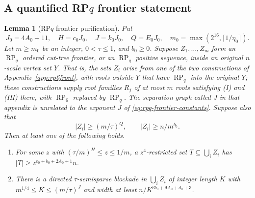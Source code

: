\documentclass[11pt,a4paper]{article}
\newtheorem{lemma}[theorem]{Lemma}
\theoremstyle{definition}
\theoremstyle{remark}
\numberwithin{equation}{section}
\DeclareMathOperator{\RP}{RP}
\begin{document}
\subsection{A quantified \texorpdfstring{RP\(q\)}{RPq} frontier statement}\label{subsec:rpq-frontier}
\begin{lemma}[RP\(q\) frontier purification]\label{lem:rpq-frontier}
Put
\begin{equation}\label{eq:rpq-frontier-constants}
 J_{0}=4A_{0}+11,\quad H=c_{0} J_{0},\quad J=k_{0} J_{0},\quad Q=E_{0} J_{0},\quad m_{0}=\max (2^{16},\lceil 1/\eta_{0}\rceil).
\end{equation}
Let \(m\ge m_{0}\) be an integer, \(0<\tau\le 1\), and \(b_{0}\ge 0\). Suppose \(Z_{1},\ldots,Z_{m}\) form an \(\RP_{q}\) ordered cut-tree frontier, or an \(\RP_{q}\) positive sequence, inside an original \(n\)-scale vertex set \(Y\). That is, the sets \(Z_{i}\) arise from one of the two constructions of Appendix~\ref{app:rp6front}, with roots outside \(Y\) that have \(\RP_{q}\) into the original \(Y\); these constructions supply root families \(R_{j}\) of at most \(m\) roots satisfying (I) and (III) there, with \(\RP_{6}\) replaced by \(\RP_{q}\). The separation graph called \(J\) in that appendix is unrelated to the exponent \(J\) of \eqref{eq:rpq-frontier-constants}. Suppose also that
\begin{equation}\label{eq:rpq-frontier-order}
 |Z_{i}| \ge (m/\tau)^{Q},\qquad |Z_{i}|\ge n/m^{b_{0}}.
\end{equation}
Then at least one of the following holds.
\begin{enumerate}[label=(\(F_{\arabic*}\))]
\item For some \(z\) with \((\tau/m)^{H}\le z\le 1/m\), a \(z^{4}\)-restricted set \(T\subseteq\bigcup_i Z_{i}\) has \(|T|\ge z^{e_{0}+b_{0}+2A_{0}+1}n\).
\item There is a directed \(\tau\)-semisparse blockade in \(\bigcup_i Z_{i}\) of integer length \(K\) with \(m^{1/4}\le K\le (m/\tau)^{J}\) and width at least \(n/K^{3b_{0}+9A_{0}+d_{0}+3}\).
\end{enumerate}


\end{lemma}
\end{document}
